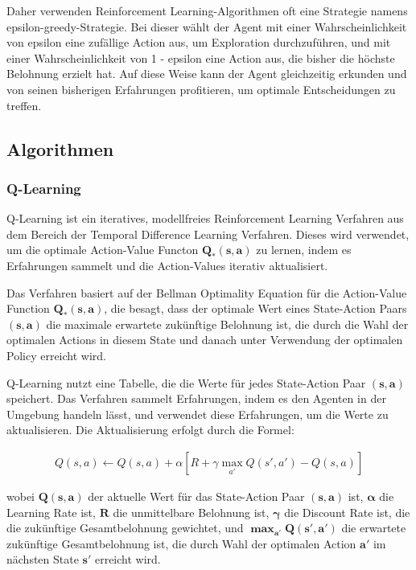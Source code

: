 \begin{enumerate}
    Daher verwenden Reinforcement Learning-Algorithmen oft eine Strategie namens epsilon-greedy-Strategie. Bei dieser wählt der Agent mit einer Wahrscheinlichkeit von epsilon eine zufällige Action aus, um Exploration durchzuführen, und mit einer Wahrscheinlichkeit von 1 - epsilon eine Action aus, die bisher die höchste Belohnung erzielt hat. Auf diese Weise kann der Agent gleichzeitig erkunden und von seinen bisherigen Erfahrungen profitieren, um optimale Entscheidungen zu treffen.

\end{enumerate}

\subsection{Algorithmen}

\subsubsection{Q-Learning}

Q-Learning ist ein iteratives, modellfreies Reinforcement Learning Verfahren aus dem Bereich der Temporal Difference Learning Verfahren. Dieses wird verwendet, um die optimale Action-Value Functon $\bm{Q_{*}(s,a)}$ zu lernen, indem es Erfahrungen sammelt und die Action-Values iterativ aktualisiert.

Das Verfahren basiert auf der Bellman Optimality Equation für die Action-Value Function $\bm{Q_{*}(s,a)}$, die besagt, dass der optimale Wert eines State-Action Paars $\bm{(s,a)}$ die maximale erwartete zukünftige Belohnung ist, die durch die Wahl der optimalen Actions in diesem State und danach unter Verwendung der optimalen Policy erreicht wird.

Q-Learning nutzt eine Tabelle, die die Werte für jedes State-Action Paar $\bm{(s,a)}$ speichert. Das Verfahren sammelt Erfahrungen, indem es den Agenten in der Umgebung handeln lässt, und verwendet diese Erfahrungen, um die Werte zu aktualisieren. Die Aktualisierung erfolgt durch die Formel:


\begin{align}
    Q(s,a) \leftarrow Q(s,a) + \alpha [R + \gamma \max_{a'} Q(s',a') - Q(s,a)]
\end{align}


wobei $\bm{Q(s,a)}$ der aktuelle Wert für das State-Action Paar $\bm{(s,a)}$ ist, $\bm\alpha$ die Learning Rate ist, $\bm{R}$ die unmittelbare Belohnung ist, $\bm\gamma$ die Discount Rate ist, die die zukünftige Gesamtbelohnung gewichtet, und $\bm{\max_{a'} Q(s',a')}$ die erwartete zukünftige Gesamtbelohnung ist, die durch Wahl der optimalen Action $\bm{a'}$ im nächsten State $\bm{s'}$ erreicht wird.

